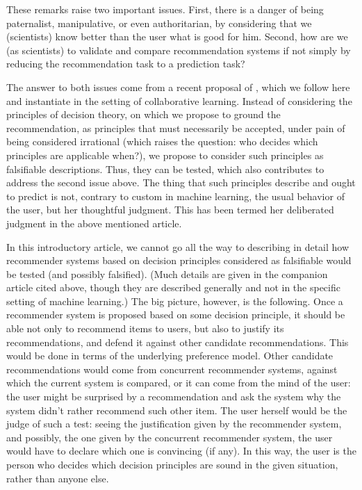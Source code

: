\documentclass[version=last, pagesize, twoside=off, bibliography=totoc, DIV=calc, fontsize=14pt, a4paper, french, english]{scrartcl}
\begin{document}
These remarks raise two important issues. First, there is a danger of being paternalist, manipulative, or even authoritarian, by considering that we (scientists) know better than the user what is good for him. Second, how are we (as scientists) to validate and compare recommendation systems if not simply by reducing the recommendation task to a prediction task?

The answer to both issues come from a recent proposal of \citet{cailloux_formal_2017}, which we follow here and instantiate in the setting of collaborative learning. Instead of considering the principles of decision theory, on which we propose to ground the recommendation, as principles that must necessarily be accepted, under pain of being considered irrational (which raises the question: who decides which principles are applicable when?), we propose to consider such principles as falsifiable descriptions. Thus, they can be tested, which also contributes to address the second issue above. The thing that such principles describe and ought to predict is not, contrary to custom in machine learning, the usual behavior of the user, but her thoughtful judgment. This has been termed her deliberated judgment in the above mentioned article.

In this introductory article, we cannot go all the way to describing in detail how recommender systems based on decision principles considered as falsifiable would be tested (and possibly falsified). (Much details are given in the companion article cited above, though they are described generally and not in the specific setting of machine learning.) The big picture, however, is the following. Once a recommender system is proposed based on some decision principle, it should be able not only to recommend items to users, but also to justify its recommendations, and defend it against other candidate recommendations. This would be done in terms of the underlying preference model. Other candidate recommendations would come from concurrent recommender systems, against which the current system is compared, or it can come from the mind of the user: the user might be surprised by a recommendation and ask the system why the system didn’t rather recommend such other item. The user herself would be the judge of such a test: seeing the justification given by the recommender system, and possibly, the one given by the concurrent recommender system, the user would have to declare which one is convincing (if any). In this way, the user is the person who decides which decision principles are sound in the given situation, rather than anyone else.
\end{document}
